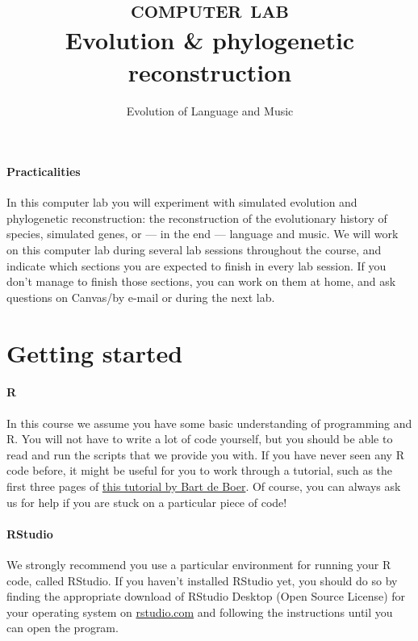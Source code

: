 \documentclass[a4paper, 9pt]{article}
\title{\textsc{computer lab}\\ \textbf{Evolution \& phylogenetic reconstruction}}
\author{Evolution of Language and Music}
\date{}
\begin{document}
\maketitle
{}


\paragraph{Practicalities}
In this computer lab you will experiment with simulated evolution and phylogenetic reconstruction: the reconstruction of the evolutionary history of species, simulated genes, or --- in the end --- language and music. 
We will work on this computer lab during several lab sessions throughout the course, and indicate which sections you are expected to finish in every lab session.
If you don't manage to finish those sections, you can work on them at home, and ask questions on Canvas/by e-mail or during the next lab.

\section{Getting started}

\paragraph{R} 
In this course we assume you have some basic understanding of programming and R. You will not have to write a lot of code yourself, but you should be able to read and run the scripts that we provide you with. If you have never seen any R code before, it might be useful for you to work through a tutorial, such as the first three pages of \href{http://projects.illc.uva.nl/LaCo/CLAS/clc13/assignments/deboer13rtutorial.pdf}{this tutorial by Bart de Boer}.
Of course, you can always ask us for help if you are stuck on a particular piece of code!

\paragraph{RStudio}
We strongly recommend you use a particular environment for running your R code, called RStudio. If you haven't installed RStudio yet, you should do so by finding the appropriate download of RStudio Desktop (Open Source License) for your operating system on \href{https://rstudio.com}{rstudio.com} and following the instructions until you can open the program.
\end{document}
